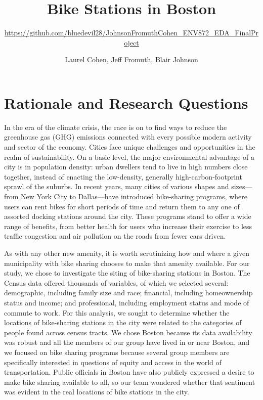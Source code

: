 \documentclass[
  12pt,
]{article}
\title{Bike Stations in Boston}
\subtitle{\url{https://github.com/bluedevil28/JohnsonFromuthCohen_ENV872_EDA_FinalProject}}
\author{Laurel Cohen, Jeff Fromuth, Blair Johnson}
\date{}
\begin{document}
\maketitle

\newpage

\hypertarget{rationale-and-research-questions}{%
\section{Rationale and Research
Questions}\label{rationale-and-research-questions}}

In the era of the climate crisis, the race is on to find ways to reduce
the greenhouse gas (GHG) emissions connected with every possible modern
activity and sector of the economy. Cities face unique challenges and
opportunities in the realm of sustainability. On a basic level, the
major environmental advantage of a city is in population density: urban
dwellers tend to live in high numbers close together, instead of
enacting the low-density, generally high-carbon-footprint sprawl of the
suburbs. In recent years, many cities of various shapes and sizes---from
New York City to Dallas---have introduced bike-sharing programs, where
users can rent bikes for short periods of time and return them to any
one of assorted docking stations around the city. These programs stand
to offer a wide range of benefits, from better health for users who
increase their exercise to less traffic congestion and air pollution on
the roads from fewer cars driven.

As with any other new amenity, it is worth scrutinizing how and where a
given municipality with bike sharing chooses to make that amenity
available. For our study, we chose to investigate the siting of
bike-sharing stations in Boston. The Census data offered thousands of
variables, of which we selected several: demographic, including family
size and race; financial, including homeownership status and income; and
professional, including employment status and mode of commute to work.
For this analysis, we sought to determine whether the locations of
bike-sharing stations in the city were related to the categories of
people found across census tracts. We chose Boston because its data
availability was robust and all the members of our group have lived in
or near Boston, and we focused on bike sharing programs because several
group members are specifically interested in questions of equity and
access in the world of transportation. Public officials in Boston have
also publicly expressed a desire to make bike sharing available to all,
so our team wondered whether that sentiment was evident in the real
locations of bike stations in the city.
\end{document}
